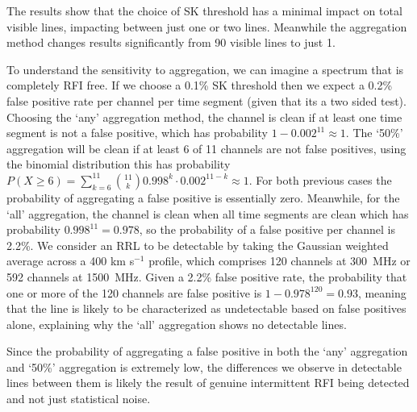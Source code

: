 The results show that the choice of SK threshold has a minimal impact on total visible lines, impacting between just one or two lines. Meanwhile the aggregation method changes results significantly from 90 visible lines to just 1.

To understand the sensitivity to aggregation, we can imagine a spectrum that is completely RFI free. If we choose a 0.1\% SK threshold then we expect a 0.2\% false positive rate per channel per time segment (given that its a two sided test). Choosing the `any' aggregation method, the channel is clean if at least one time segment is not a false positive, which  has probability \(1 -0.002^{11}\approx1\). The `50\%' aggregation will be clean if at least 6 of 11 channels are not false positives, using the binomial distribution this has probability \(P(X\ge 6) = \sum_{k=6}^{11}{11 \choose k}0.998^k\cdot0.002^{11-k}\approx1\). For both previous cases the probability of aggregating a false positive is essentially zero. Meanwhile, for the `all' aggregation, the channel is clean when all time segments are clean which has probability \(0.998^{11} = 0.978\), so the probability of a false positive per channel is 2.2\%. We consider an RRL to be detectable by taking the Gaussian weighted average across a 400 km s$^{-1}$ profile, which comprises 120 channels at 300~MHz or 592 channels at 1500~MHz. Given a 2.2\% false positive rate, the probability that one or more of the 120 channels are false positive is \(1-0.978^{120}=0.93\), meaning that the line is likely to be characterized as undetectable based on false positives alone, explaining why the `all' aggregation shows no detectable lines.

Since the probability of aggregating a false positive in both the `any' aggregation and `50\%' aggregation is extremely low, the differences we observe in detectable lines between them is likely the result of genuine intermittent RFI being detected and not just statistical noise.


